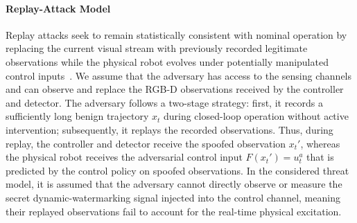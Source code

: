 \documentclass[letterpaper, 10 pt, conference]{ieeeconf}
\newcommand{\EditAN}[1]{{\color{blue} #1}}
\theoremstyle{plain}
\begin{document}
\paragraph{Replay-Attack Model}
Replay attacks seek to remain statistically consistent with nominal operation by replacing the current visual stream with previously recorded legitimate observations while the physical robot evolves under potentially manipulated control inputs~\cite{aftabi2025dynamark}. We assume that the adversary has access to the sensing channels and can observe and replace the RGB-D observations received by the controller and detector. The adversary follows a two-stage strategy: first, it records a sufficiently long benign trajectory $x_t$ during closed-loop operation without active intervention; subsequently, it replays the recorded observations. Thus, during replay, the controller and detector receive the spoofed observation $x_t'$, whereas the physical robot receives the adversarial control input $F(x_t') = u_t^{a}$ that is predicted by the control policy on spoofed observations. In the considered threat model, it is assumed that the adversary cannot directly observe or measure the secret dynamic-watermarking signal injected into the control channel, meaning their replayed observations fail to account for the real-time physical excitation.
\end{document}
